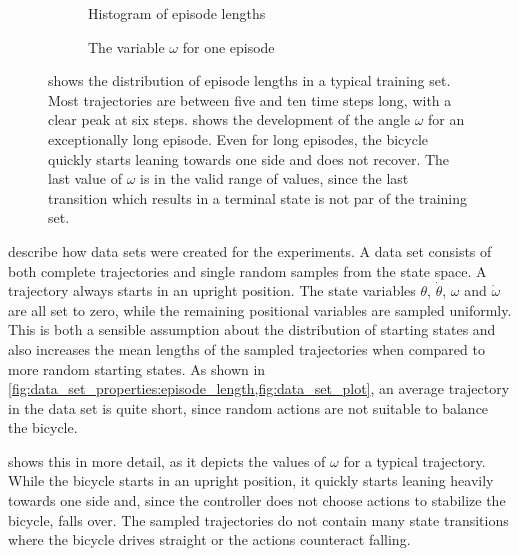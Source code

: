\begin{figure}[t]
    \centering
    \begin{subfigure}{\subfigurewidth}
        \centering
        \caption{Histogram of episode lengths}
        \label{fig:data_set_properties:episode_length}
    \end{subfigure}
    \begin{subfigure}{\subfigurewidth}
        \centering
        \caption{The variable $\omega$ for one episode}
        \label{fig:data_set_properties:omega_example}
    \end{subfigure}
    \caption[Data set properties]{
         shows the distribution of episode lengths in a typical training set.
        Most trajectories are between five and ten time steps long, with a clear peak at six steps.
         shows the development of the angle $\omega$ for an exceptionally long episode.
        Even for long episodes, the bicycle quickly starts leaning towards one side and does not recover.
        The last value of $\omega$ is in the valid range of values, since the last transition which results in a terminal state is not par of the training set.
    }
    \label{fig:data_set_properties}
\end{figure}
 describe how data sets were created for the experiments.
A data set consists of both complete trajectories and single random samples from the state space.
A trajectory always starts in an upright position.
The state variables $\theta$, $\dot{\theta}$, $\omega$ and $\dot{\omega}$ are all set to zero, while the remaining positional variables are sampled uniformly.
This is both a sensible assumption about the distribution of starting states and also increases the mean lengths of the sampled trajectories when compared to more random starting states.
As shown in \cref{fig:data_set_properties:episode_length,fig:data_set_plot}, an average trajectory in the data set is quite short, since random actions are not suitable to balance the bicycle.

 shows this in more detail, as it depicts the values of $\omega$ for a typical trajectory.
While the bicycle starts in an upright position, it quickly starts leaning heavily towards one side and, since the controller does not choose actions to stabilize the bicycle, falls over.
The sampled trajectories do not contain many state transitions where the bicycle drives straight or the actions counteract falling.

